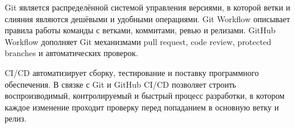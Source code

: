 \documentclass[12pt,a4paper]{article}
\begin{document}
Git является распределённой системой управления версиями, в которой ветки и слияния являются дешёвыми и удобными операциями. Git Workflow описывает правила работы команды с ветками, коммитами, ревью и релизами. GitHub Workflow дополняет Git механизмами pull request, code review, protected branches и автоматических проверок.

CI/CD автоматизирует сборку, тестирование и поставку программного обеспечения. В связке с Git и GitHub CI/CD позволяет строить воспроизводимый, контролируемый и быстрый процесс разработки, в котором каждое изменение проходит проверку перед попаданием в основную ветку и релиз.
\end{document}
